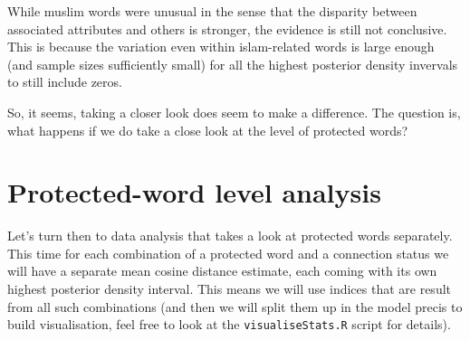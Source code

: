 \documentclass[]{book}
\begin{document}
\normalsize

While muslim words were unusual in the sense that the disparity between
associated attributes and others is stronger, the evidence is still not
conclusive. This is because the variation even within islam-related
words is large enough (and sample sizes sufficiently small) for all the
highest posterior density invervals to still include zeros.

So, it seems, taking a closer look does seem to make a difference. The
question is, what happens if we do take a close look at the level of
protected words?

\chapter{Protected-word level
analysis}\label{protected-word-level-analysis}

Let's turn then to data analysis that takes a look at protected words
separately. This time for each combination of a protected word and a
connection status we will have a separate mean cosine distance estimate,
each coming with its own highest posterior density interval. This means
we will use indices that are result from all such combinations (and then
we will split them up in the model precis to build visualisation, feel
free to look at the \texttt{visualiseStats.R} script for details).

\vspace{1mm} \footnotesize
\end{document}
